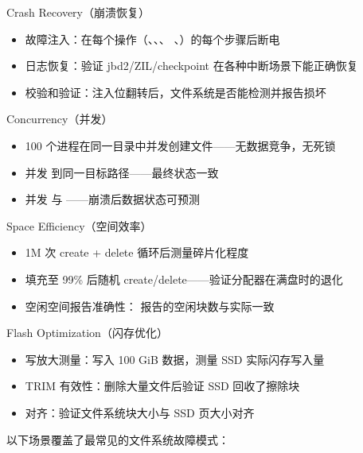 \begin{filesystemlayout}
\begin{rubricbox}{Crash Recovery（崩溃恢复）}
\begin{itemize}\tightlist
\item 故障注入：在每个操作（、、、
      、）的每个步骤后断电
\item 日志恢复：验证 jbd2/ZIL/checkpoint 在各种中断场景下能正确恢复
\item 校验和验证：注入位翻转后，文件系统是否能检测并报告损坏
\end{itemize}
\end{rubricbox}

\begin{rubricbox}{Concurrency（并发）}
\begin{itemize}\tightlist
\item 100 个进程在同一目录中并发创建文件——无数据竞争，无死锁
\item 并发  到同一目标路径——最终状态一致
\item 并发  与 ——崩溃后数据状态可预测
\end{itemize}
\end{rubricbox}

\begin{rubricbox}{Space Efficiency（空间效率）}
\begin{itemize}\tightlist
\item 1M 次 create + delete 循环后测量碎片化程度
\item 填充至 99\% 后随机 create/delete——验证分配器在满盘时的退化
\item 空闲空间报告准确性： 报告的空闲块数与实际一致
\end{itemize}
\end{rubricbox}

\begin{rubricbox}{Flash Optimization（闪存优化）}
\begin{itemize}\tightlist
\item 写放大测量：写入 100 GiB 数据，测量 SSD 实际闪存写入量
\item TRIM 有效性：删除大量文件后验证 SSD 回收了擦除块
\item 对齐：验证文件系统块大小与 SSD 页大小对齐
\end{itemize}
\end{rubricbox}


以下场景覆盖了最常见的文件系统故障模式：


\end{filesystemlayout}
